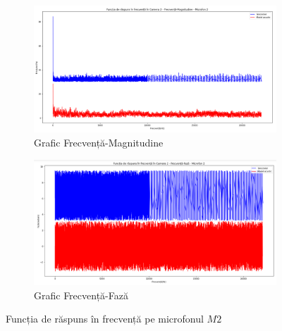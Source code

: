 \begin{figure}[!htb]%
	\begin{subfigure}[b]{.48\textwidth}
		\centering
		\includegraphics[width=1\linewidth]{imagini/ir_2.png} 
		\caption{Grafic Frecvență-Magnitudine}
	\end{subfigure}
	\hfill
	\begin{subfigure}[b]{.48\textwidth}
		\centering
		\includegraphics[width=1\linewidth]{imagini/ir_1_2.png}
		\caption{Grafic Frecvență-Fază}
	\end{subfigure}
	
	\caption{Funcția de răspuns în frecvență pe microfonul $M2$}
	\label{fig:Fig26}	
\end{figure}
